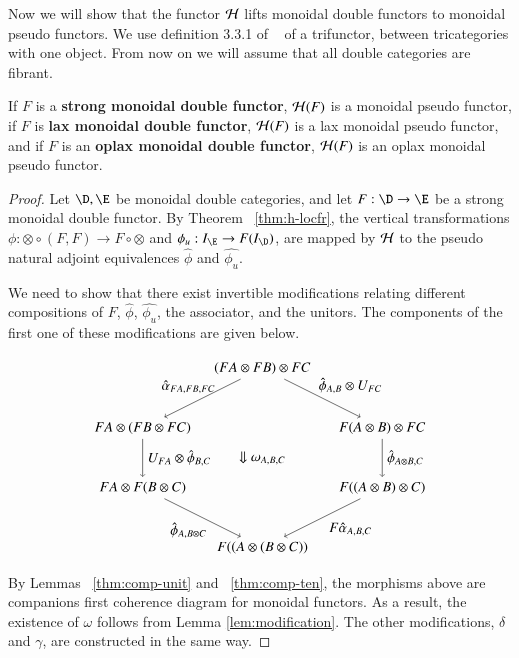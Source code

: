 Now we will show that the functor $\mathcal{H}$ lifts monoidal double functors to monoidal pseudo functors. We use definition 3.3.1 of ~\cite{nick:tricats} of a trifunctor, between tricategories with one object. From now on we will assume that all double categories are fibrant.

\begin{lem}\label{lem:monfun}
If $F$ is a {\bf strong monoidal double functor}, $\mathcal{H}(F)$ is a monoidal pseudo functor, if $F$ is {\bf lax monoidal double functor}, $\mathcal{H}(F)$ is a lax monoidal pseudo functor, and if $F$ is an {\bf oplax monoidal double functor}, $\mathcal{H}(F)$ is an oplax monoidal pseudo functor. 
\end{lem}

\begin{proof}
Let $\D, \E$ be monoidal double categories, and let $F:\D \rightarrow \E$ be a strong monoidal double functor. 
By Theorem ~\ref{thm:h-locfr}, the vertical transformations $\phi: \otimes \circ (F,F) \rightarrow F \circ \otimes $ and $\phi_u: I_{\E} \rightarrow F(I_{\D})$, are mapped by $\mathcal{H}$ to the pseudo natural adjoint equivalences $\hat{\phi}$ and $\hat{\phi_u}$.

We need to show that there exist invertible modifications relating  different compositions of $F$, $\hat{\phi}$, $\hat{\phi_u}$, the associator, and the unitors. 
The components of the first one of these modifications are given below.

\begin{equation}
\begin{tikzpicture}[scale=1.5]
\node (t) at (2,3) {$(FA \otimes FB) \otimes FC$};
\node (tl) at (0,2) {$FA \otimes (FB \otimes FC)$};
\node (bl) at (0,1) {$FA \otimes  F(B \otimes C)$};
\node (b) at (2,0) {$F((A \otimes (B \otimes C))$};
\node (tr) at (4,2) {$F(A \otimes B) \otimes FC$};
\node (br) at (4,1) {$F((A \otimes B) \otimes C)$};
\draw[->] (t) to node [above,xshift=20pt] {$\hat{\phi}_{A,B} \otimes U_{FC}$} (tr);
\draw[->] (tr) to node [right] {$\hat{\phi}_{A \otimes B,C} $} (br);
\draw[->] (br) to node [below,xshift=20pt] {$F\hat{\alpha}_{A,B,C}$} (b);
\draw[->] (t) to node [above,xshift=-10pt] {$\hat{\alpha}_{FA, FB, FC}$} (tl);
\draw[->] (tl) to node [right] {$U_{FA} \otimes \hat{\phi}_{B,C} $} (bl);
\draw[->] (bl) to node [below,xshift=-10pt] {$\hat{\phi}_{A, B \otimes C}$} (b);
\node at (2,1.5) {$\Downarrow \omega_{A,B,C}$};
\end{tikzpicture}
\end{equation} 

By Lemmas ~\ref{thm:comp-unit}
and ~\ref{thm:comp-ten}, the morphisms above are companions first coherence diagram for monoidal functors. As a result, the existence of $\omega$ follows from Lemma \ref{lem:modification}. The other modifications, $\delta$ and $\gamma$, are constructed in the same way.


\end{proof}
